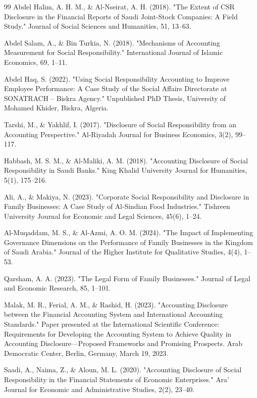 \documentclass[10pt]{NSP1}
\begin{document}
\begin{thebibliography}{99}
Abdel Halim, A. H. M., \& Al-Nseirat, A. H. (2018). "The Extent of CSR Disclosure in the Financial Reports of Saudi Joint-Stock Companies: A Field Study." Journal of Social Sciences and Humanities, 51, 13–63.

Abdel Salam, A., \& Bin Turkia, N. (2018). "Mechanisms of Accounting Measurement for Social Responsibility." International Journal of Islamic Economics, 69, 1–11.

Abdel Haq, S. (2022). "Using Social Responsibility Accounting to Improve Employee Performance: A Case Study of the Social Affairs Directorate at SONATRACH – Biskra Agency." Unpublished PhD Thesis, University of Mohamed Khider, Biskra, Algeria.

Tarshi, M., \& Yakhlif, I. (2017). "Disclosure of Social Responsibility from an Accounting Perspective." Al-Riyadah Journal for Business Economics, 3(2), 99–117.

Habbash, M. S. M., \& Al-Maliki, A. M. (2018). "Accounting Disclosure of Social Responsibility in Saudi Banks." King Khalid University Journal for Humanities, 5(1), 175–216.

Ali, A., \& Makiya, N. (2023). "Corporate Social Responsibility and Disclosure in Family Businesses: A Case Study of Al-Sindian Food Industries." Tishreen University Journal for Economic and Legal Sciences, 45(6), 1–24.

Al-Muqaddam, M. S., \& Al-Azmi, A. O. M. (2024). "The Impact of Implementing Governance Dimensions on the Performance of Family Businesses in the Kingdom of Saudi Arabia." Journal of the Higher Institute for Qualitative Studies, 4(4), 1–53.

Qarsham, A. A. (2023). "The Legal Form of Family Businesses." Journal of Legal and Economic Research, 85, 1–101.

Malak, M. R., Ferial, A. M., \& Rashid, H. (2023). "Accounting Disclosure between the Financial Accounting System and International Accounting Standards." Paper presented at the International Scientific Conference: Requirements for Developing the Accounting System to Achieve Quality in Accounting Disclosure—Proposed Frameworks and Promising Prospects. Arab Democratic Center, Berlin, Germany, March 19, 2023.

Saadi, A., Naima, Z., \& Aloun, M. L. (2020). "Accounting Disclosure of Social Responsibility in the Financial Statements of Economic Enterprises." Ara’ Journal for Economic and Administrative Studies, 2(2), 23–40.


\end{thebibliography}
\end{document}
